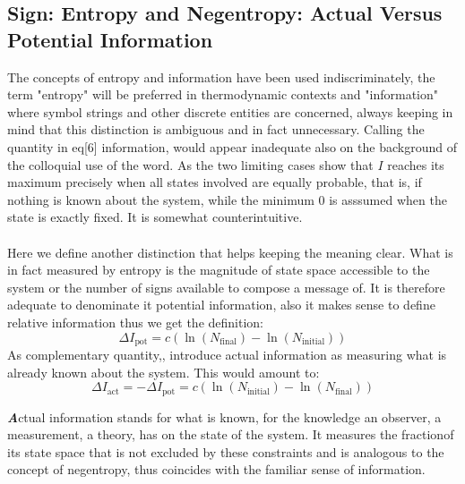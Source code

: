 \documentclass[9pt,a4paper, twocolumn]{article}
\newcounter{theo}
\newenvironment{callout}
	{\begin{calloutbox}\color{charcoal}\textbf\textit}
	{\end{calloutbox}}
\begin{document}
        \subsection{Sign: Entropy and Negentropy: Actual Versus Potential Information}
        The concepts of entropy and information have been used indiscriminately, the term "entropy" will be preferred in thermodynamic contexts and "information" where symbol strings and other discrete entities are concerned, always keeping in mind that this distinction is ambiguous and in fact unnecessary. Calling the quantity in eq[6] information, would appear inadequate also on the background of the colloquial use of the word. As the two limiting cases show that $I$ reaches its maximum precisely when all states involved are equally probable, that is, if nothing is known about the system, while the minimum $0$ is asssumed when the state is exactly fixed. It is somewhat counterintuitive.
        \\
        \\
        Here we define another distinction that helps keeping the meaning clear. What is in fact measured by entropy is the magnitude of state space accessible to the system or the number of signs available to compose a message of. It is therefore adequate to denominate it potential information, also it makes sense to define relative information thus we get the definition:
        \begin{equation}
            \Delta I_{\text{pot}} = c\left(\ln(N_{\text{final}}) - \ln(N_{\text{initial}})\right)
        \end{equation}
        As complementary quantity,, introduce actual information as measuring what is already known about the system. This would amount to:
        \begin{equation}
            \Delta I_{\text{act}} = -    \Delta I_{\text{pot}} = c\left(\ln(N_{\text{initial}}) - \ln(N_{\text{final}})\right)
        \end{equation}
        \begin{callout}
            Actual information stands for what is known, for the knowledge an observer, a measurement, a theory, has on the state of the system. It measures the fractionof its state space that is not excluded by these constraints and is analogous to the concept of negentropy, thus coincides with the familiar sense of information.    
        \end{callout}
      
\end{document}
